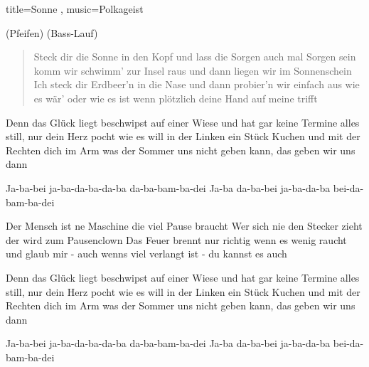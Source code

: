 \begin{song}{
	title={Sonne}
,	music={Polkageist}
}

(Pfeifen)
(Bass-Lauf)

\begin{verse}
Steck dir die Sonne in den Kopf
und lass die Sorgen auch mal Sorgen sein
komm wir schwimm' zur Insel raus
und dann liegen wir im Sonnenschein
Ich steck dir Erdbeer'n in die Nase
und dann probier'n wir einfach aus
wie es wär' oder wie es ist
wenn plötzlich deine Hand auf meine trifft
\end{verse}

\begin{chorus}
Denn das Glück liegt beschwipst auf einer Wiese
und hat gar keine Termine
alles still, nur dein Herz pocht wie es will
in der Linken ein Stück Kuchen
und mit der Rechten dich im Arm
was der Sommer uns nicht geben kann, das geben wir uns dann
\end{chorus}

Ja-ba-bei ja-ba-da-ba-da-ba da-ba-bam-ba-dei
Ja-ba da-ba-bei ja-ba-da-ba bei-da-bam-ba-dei


Der Mensch ist ne Maschine die viel Pause braucht
Wer sich nie den Stecker zieht der wird zum Pausenclown
Das Feuer brennt nur richtig wenn es wenig raucht
und glaub mir - auch wenns viel verlangt ist - du kannst es auch

\begin{chorus}
Denn das Glück liegt beschwipst auf einer Wiese
und hat gar keine Termine
alles still, nur dein Herz pocht wie es will
in der Linken ein Stück Kuchen
und mit der Rechten dich im Arm
was der Sommer uns nicht geben kann, das geben wir uns dann
\end{chorus}

Ja-ba-bei ja-ba-da-ba-da-ba da-ba-bam-ba-dei
Ja-ba da-ba-bei ja-ba-da-ba bei-da-bam-ba-dei


\end{song}
